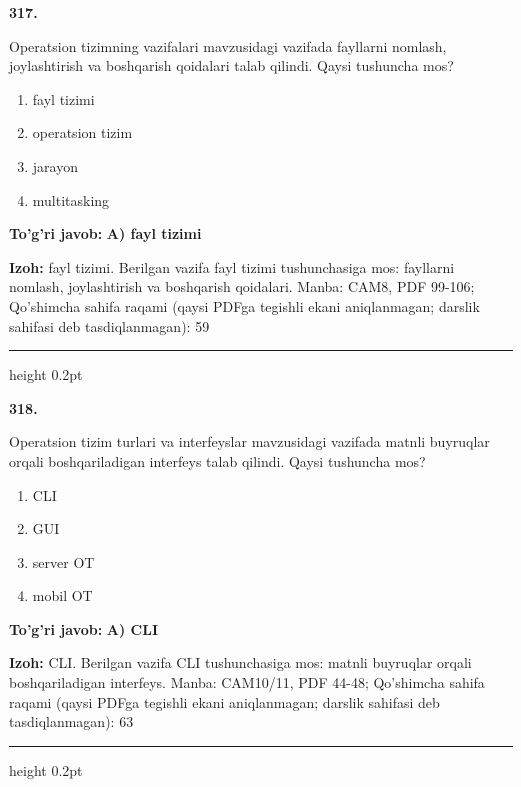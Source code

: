 \documentclass[10pt,a4paper]{article}
\begin{document}
{\bfseries\sffamily\color{ink} 317.}
\par
Operatsion tizimning vazifalari mavzusidagi vazifada fayllarni nomlash, joylashtirish va boshqarish qoidalari talab qilindi. Qaysi tushuncha mos?
\begin{enumerate}[label=\Alph*),leftmargin=9mm]
\item fayl tizimi
\item operatsion tizim
\item jarayon
\item multitasking
\end{enumerate}
\begin{tcolorbox}[enhanced,breakable,colback=teal!4,colframe=teal!60!black,boxrule=0.45pt,arc=1.2mm,left=2.7mm,right=2.7mm,top=1.8mm,bottom=1.8mm,before skip=2mm,after skip=2mm]
{\bfseries\sffamily\color{teal}To'g'ri javob:} \textbf{A) fayl tizimi}
\par\smallskip
{\bfseries Izoh:} fayl tizimi. Berilgan vazifa fayl tizimi tushunchasiga mos: fayllarni nomlash, joylashtirish va boshqarish qoidalari. Manba: CAM8, PDF 99-106; Qo'shimcha sahifa raqami (qaysi PDFga tegishli ekani aniqlanmagan; darslik sahifasi deb tasdiqlanmagan): 59
\end{tcolorbox}
\vspace{2mm}\hrule height 0.2pt\vspace{3mm}

{\bfseries\sffamily\color{ink} 318.}
\par
Operatsion tizim turlari va interfeyslar mavzusidagi vazifada matnli buyruqlar orqali boshqariladigan interfeys talab qilindi. Qaysi tushuncha mos?
\begin{enumerate}[label=\Alph*),leftmargin=9mm]
\item CLI
\item GUI
\item server OT
\item mobil OT
\end{enumerate}
\begin{tcolorbox}[enhanced,breakable,colback=teal!4,colframe=teal!60!black,boxrule=0.45pt,arc=1.2mm,left=2.7mm,right=2.7mm,top=1.8mm,bottom=1.8mm,before skip=2mm,after skip=2mm]
{\bfseries\sffamily\color{teal}To'g'ri javob:} \textbf{A) CLI}
\par\smallskip
{\bfseries Izoh:} CLI. Berilgan vazifa CLI tushunchasiga mos: matnli buyruqlar orqali boshqariladigan interfeys. Manba: CAM10/11, PDF 44-48; Qo'shimcha sahifa raqami (qaysi PDFga tegishli ekani aniqlanmagan; darslik sahifasi deb tasdiqlanmagan): 63
\end{tcolorbox}
\vspace{2mm}\hrule height 0.2pt\vspace{3mm}
\end{document}
